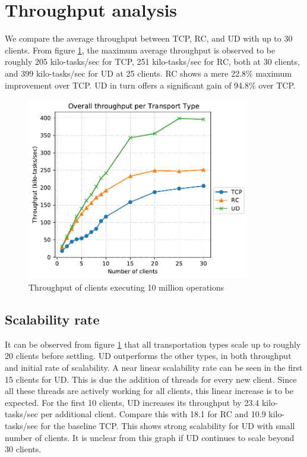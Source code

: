 \section{Throughput analysis}\label{sec:throughput-analysis}
We compare the average throughput between TCP, RC, and UD with up to 30 clients.
From figure \ref{fig:throughput-30}, the maximum average throughput is observed to be roughly 205 kilo-tasks/sec for TCP, 251 kilo-tasks/sec for RC, both at 30 clients, and 399 kilo-tasks/sec for UD at 25 clients.
RC shows a mere 22.8\% maximum improvement over TCP.
UD in turn offers a significant gain of 94.8\% over TCP.
\begin{figure}
    \centering
    \includegraphics[height=8cm]{figures/PDF/Throughput_30}
    \caption{Throughput of clients executing 10 million operations}
    \label{fig:throughput-30}
\end{figure}

\subsection{Scalability rate}\label{subsec:scalability-rate}
It can be observed from figure \ref{fig:throughput-30} that all transportation types scale up to roughly 20 clients before settling.
UD outperforms the other types, in both throughput and initial rate of scalability.
A near linear scalability rate can be seen in the first 15 clients for UD.
This is due the addition of threads for every new client.
Since all these threads are actively working for all clients, this linear increase is to be expected.
For the first 10 clients, UD increases its throughput by 23.4 kilo-tasks/sec per additional client.
Compare this with 18.1 for RC and 10.9 kilo-tasks/sec for the baseline TCP.
This shows strong scalability for UD with small number of clients.
It is unclear from this graph if UD continues to scale beyond 30 clients.

